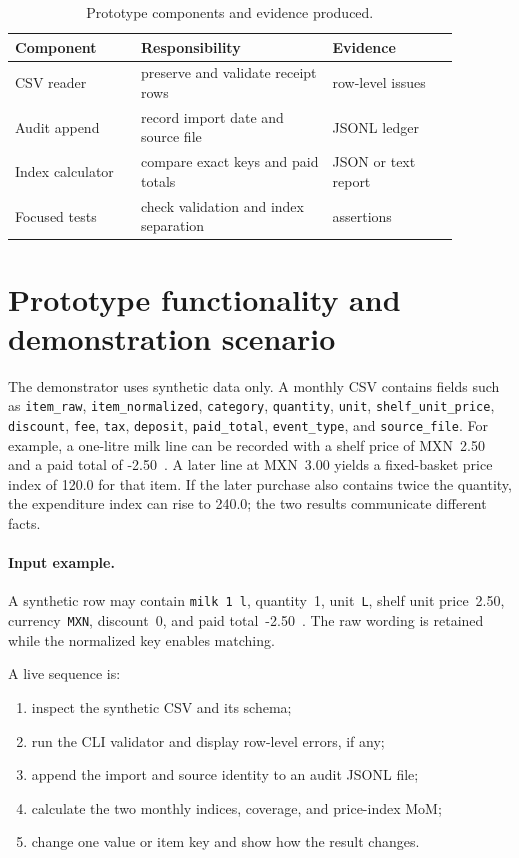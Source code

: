 \documentclass[10pt,a4paper]{article}
\newcommand{\chapter}[1]{
  \section{#1}
}
\begin{document}
\begin{table}[h]
\centering
\caption{Prototype components and evidence produced.}
\small
\begin{tabular}{p{0.25\linewidth}p{0.38\linewidth}p{0.25\linewidth}}
\toprule
Component & Responsibility & Evidence\\
\midrule
CSV reader & preserve and validate receipt rows & row-level issues\\
Audit append & record import date and source file & JSONL ledger\\
Index calculator & compare exact keys and paid totals & JSON or text report\\
Focused tests & check validation and index separation & assertions\\
\bottomrule
\end{tabular}
\end{table}

\chapter{Prototype functionality and demonstration scenario}

The demonstrator uses synthetic data only. A monthly CSV contains fields such
as \texttt{item\_raw}, \texttt{item\_normalized}, \texttt{category},
\texttt{quantity}, \texttt{unit}, \texttt{shelf\_unit\_price},
\texttt{discount}, \texttt{fee}, \texttt{tax}, \texttt{deposit},
\texttt{paid\_total}, \texttt{event\_type}, and \texttt{source\_file}.
For example, a one-litre milk line can be recorded with a shelf price of
MXN~2.50 and a paid total of -2.50~. A later line at
MXN~3.00 yields a
fixed-basket price index of 120.0 for that item. If the later purchase also
contains twice the quantity, the expenditure index can rise to 240.0; the two
results communicate different facts.

\paragraph{Input example.} A synthetic row may contain
\texttt{milk 1 l}, quantity~1, unit~\texttt{L}, shelf unit price~2.50,
currency~\texttt{MXN}, discount~0, and paid total~-2.50~.
The raw wording is
retained while the normalized key enables matching.

A live sequence is:

\begin{enumerate}
  \item inspect the synthetic CSV and its schema;
  \item run the CLI validator and display row-level errors, if any;
  \item append the import and source identity to an audit JSONL file;
  \item calculate the two monthly indices, coverage, and price-index MoM;
  \item change one value or item key and show how the result changes.
\end{enumerate}
\end{document}
